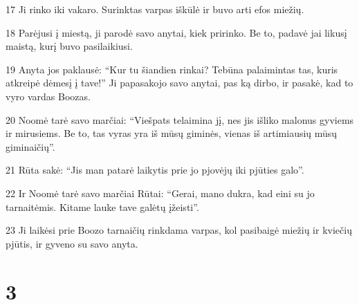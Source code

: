 \par 17 Ji rinko iki vakaro. Surinktas varpas iškūlė ir buvo arti efos miežių. 
\par 18 Parėjusi į miestą, ji parodė savo anytai, kiek pririnko. Be to, padavė jai likusį maistą, kurį buvo pasilaikiusi. 
\par 19 Anyta jos paklausė: “Kur tu šiandien rinkai? Tebūna palaimintas tas, kuris atkreipė dėmesį į tave!” Ji papasakojo savo anytai, pas ką dirbo, ir pasakė, kad to vyro vardas Boozas. 
\par 20 Noomė tarė savo marčiai: “Viešpats telaimina jį, nes jis išliko malonus gyviems ir mirusiems. Be to, tas vyras yra iš mūsų giminės, vienas iš artimiausių mūsų giminaičių”. 
\par 21 Rūta sakė: “Jis man patarė laikytis prie jo pjovėjų iki pjūties galo”. 
\par 22 Ir Noomė tarė savo marčiai Rūtai: “Gerai, mano dukra, kad eini su jo tarnaitėmis. Kitame lauke tave galėtų įžeisti”. 
\par 23 Ji laikėsi prie Boozo tarnaičių rinkdama varpas, kol pasibaigė miežių ir kviečių pjūtis, ir gyveno su savo anyta.



\chapter{3}

